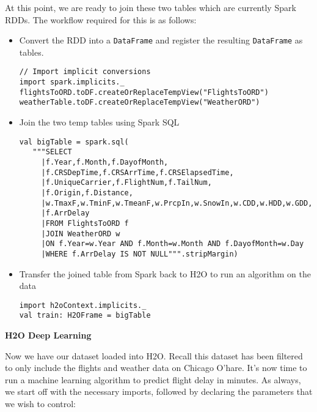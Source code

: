 At this point, we are ready to join these two tables which are currently Spark RDDs. The workflow required for this is as follows:
\begin{itemize}
\item Convert the RDD into a \texttt{DataFrame} and register the resulting \texttt{DataFrame} as tables.
\begin{lstlisting}[style=Scala]
// Import implicit conversions
import spark.implicits._
flightsToORD.toDF.createOrReplaceTempView("FlightsToORD")
weatherTable.toDF.createOrReplaceTempView("WeatherORD")
\end{lstlisting}
\item Join the two temp tables using Spark SQL 
\begin{lstlisting}[style=Scala]
val bigTable = spark.sql(
   """SELECT
     |f.Year,f.Month,f.DayofMonth,
     |f.CRSDepTime,f.CRSArrTime,f.CRSElapsedTime,
     |f.UniqueCarrier,f.FlightNum,f.TailNum,
     |f.Origin,f.Distance,
     |w.TmaxF,w.TminF,w.TmeanF,w.PrcpIn,w.SnowIn,w.CDD,w.HDD,w.GDD,
     |f.ArrDelay
     |FROM FlightsToORD f
     |JOIN WeatherORD w
     |ON f.Year=w.Year AND f.Month=w.Month AND f.DayofMonth=w.Day
     |WHERE f.ArrDelay IS NOT NULL""".stripMargin)
\end{lstlisting}

\item Transfer the joined table from Spark back to H2O to run an algorithm on the data
\begin{lstlisting}[style=Scala]
import h2oContext.implicits._
val train: H2OFrame = bigTable
\end{lstlisting}
\end{itemize}


\textbf{H2O Deep Learning}

Now we have our dataset loaded into H2O. Recall this dataset has been filtered to only include the flights and weather data on Chicago O'hare. It's now time to run a machine learning algorithm to predict flight delay in minutes. As always, we start off with the necessary imports, followed by declaring the parameters that we wish to control:

